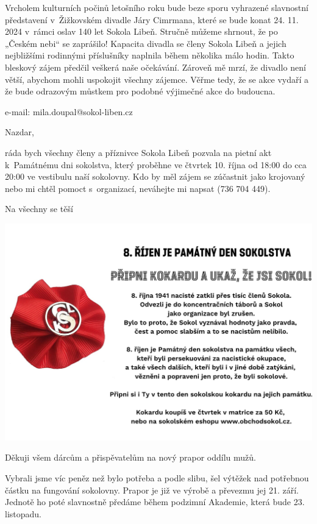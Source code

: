 \documentclass[11pt]{article}
\begin{document}
Vrcholem kulturních počinů letošního roku bude beze sporu vyhrazené slavnostní představení v~Žižkovském divadle Járy Cimrmana, které se bude konat 24. 11. 2024 v~rámci oslav 140 let Sokola Libeň. Stručně můžeme shrnout, že po „Českém nebi“ se zaprášilo! Kapacita divadla se členy Sokola Libeň a jejich nejbližšími rodinnými příslušníky naplnila během několika málo hodin. Takto bleskový zájem předčil veškerá naše očekávání. Zároveň mě mrzí, že divadlo není větší, abychom mohli uspokojit všechny zájemce. Věřme tedy, že se akce vydaří a že bude odrazovým můstkem pro podobné výjimečné akce do budoucna.

\signature{Miloslav Doupal}{e-mail: mila.doupal@sokol-liben.cz}
\vspace*{24pt}


Nazdar, 

\noindent
ráda bych všechny členy a příznivce Sokola Libeň pozvala na pietní akt k~Památnému dni sokolstva, který proběhne ve čtvrtek 10. října od 18:00 do cca 20:00 ve vestibulu naší sokolovny. Kdo by měl zájem se zúčastnit jako krojovaný nebo mi chtěl pomoct s~organizací, neváhejte mi napsat (736 704 449).

Na všechny se těší
\signature{Bára Jeníková}{}

\begin{center}
  \noindent\includegraphics[width=\linewidth]{pripni-kokardu.png}
\end{center}


Děkuji všem dárcům a přispěvatelům na nový prapor oddílu mužů.

Vybrali jsme víc peněz než bylo potřeba a podle slibu, šel výtěžek nad potřebnou částku na fungování sokolovny. Prapor je již ve výrobě a převezmu jej 21. září. Jednotě ho poté slavnostně předáme během podzimní Akademie, která bude 23. listopadu.
\end{document}
